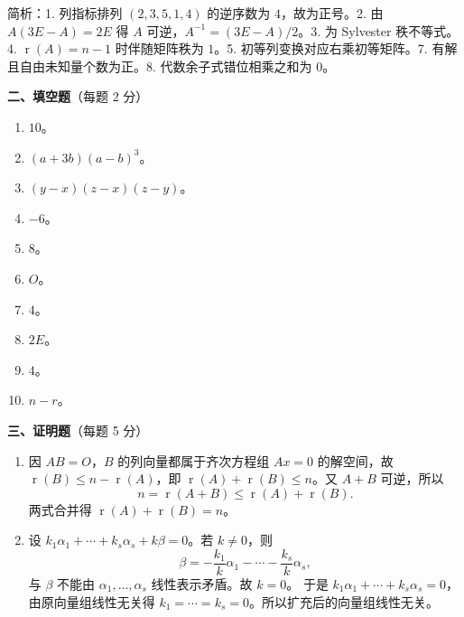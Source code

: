 \documentclass[12pt]{ctexart}
\newcommand{\rnk}{\operatorname{r}}
\begin{document}
\noindent\small 简析：1. 列指标排列 $(2,3,5,1,4)$ 的逆序数为 $4$，故为正号。2. 由
$A(3E-A)=2E$ 得 $A$ 可逆，$A^{-1}=(3E-A)/2$。3. 为 Sylvester 秩不等式。
4. $\rnk(A)=n-1$ 时伴随矩阵秩为 $1$。5. 初等列变换对应右乘初等矩阵。7. 有解且自由未知量个数为正。8. 代数余子式错位相乘之和为 $0$。\normalsize

\vspace{8pt}
\noindent\textbf{二、填空题}（每题 2 分）
\begin{enumerate}[label=\arabic*.,itemsep=3pt]
\item $10$。
\item $(a+3b)(a-b)^3$。
\item $(y-x)(z-x)(z-y)$。
\item $-6$。
\item $8$。
\item $O$。
\item $4$。
\item $2E$。
\item $4$。
\item $n-r$。
\end{enumerate}

\vspace{6pt}
\noindent\textbf{三、证明题}（每题 5 分）
\begin{enumerate}[label=\textbf{\arabic*.},itemsep=10pt]
\item 因 $AB=O$，$B$ 的列向量都属于齐次方程组 $Ax=0$ 的解空间，故
  $\rnk(B)\leq n-\rnk(A)$，即 $\rnk(A)+\rnk(B)\leq n$。又
  $A+B$ 可逆，所以
  \[
  n=\rnk(A+B)\leq \rnk(A)+\rnk(B).
  \]
  两式合并得 $\rnk(A)+\rnk(B)=n$。

\item 设
  $k_1\alpha_1+\cdots+k_s\alpha_s+k\beta=0$。若 $k\neq0$，则
  \[
  \beta=-\frac{k_1}{k}\alpha_1-\cdots-\frac{k_s}{k}\alpha_s,
  \]
  与 $\beta$ 不能由 $\alpha_1,\dots,\alpha_s$ 线性表示矛盾。故 $k=0$。
  于是 $k_1\alpha_1+\cdots+k_s\alpha_s=0$，由原向量组线性无关得
  $k_1=\cdots=k_s=0$。所以扩充后的向量组线性无关。
\end{enumerate}
\end{document}
